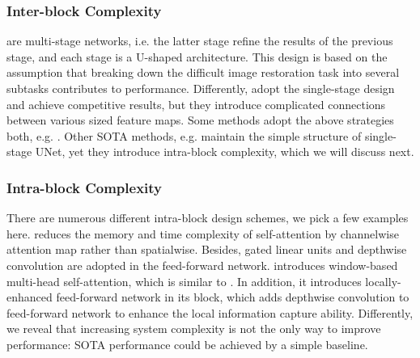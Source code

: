 \documentclass[runningheads]{llncs}
\begin{document}
\subsubsection{Inter-block Complexity}
\cite{waqas2021multi,chen2021hinet} are multi-stage networks, i.e. the latter stage refine the results of the previous stage, and each stage is a U-shaped architecture. This design is based on the assumption that breaking down the difficult image restoration task into several subtasks contributes to performance. Differently, \cite{cho2021rethinking,mao2021deep} adopt the single-stage design and achieve competitive results, but they introduce complicated connections between various sized feature maps. Some methods adopt the above strategies both, e.g. \cite{tu2022maxim}. Other SOTA methods, e.g. \cite{zamir2021restormer,wang2021uformer} maintain the simple structure of single-stage UNet, yet they introduce intra-block complexity, which we will discuss next.

\subsubsection{Intra-block Complexity}
There are numerous different intra-block design schemes, we pick a few examples here. \cite{zamir2021restormer} reduces the memory and time complexity of self-attention\cite{vaswani2017attention} by channelwise attention map rather than spatialwise. Besides, gated linear units\cite{dauphin2017language} and depthwise convolution are adopted in the feed-forward network. \cite{wang2021uformer} introduces window-based multi-head self-attention, which is similar to \cite{liu2021swin}. In addition, it introduces locally-enhanced feed-forward network in its block, which adds depthwise convolution to feed-forward network to enhance the local information capture ability. Differently, we reveal that increasing system complexity is not the only way to improve performance: SOTA performance could be achieved by a simple baseline.
\end{document}
